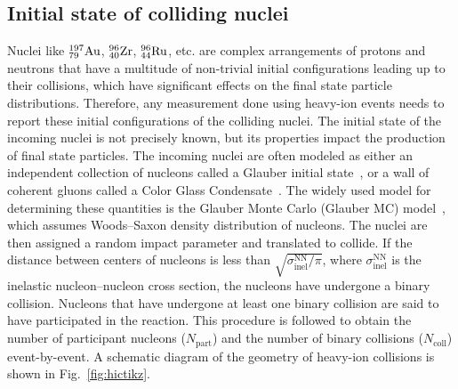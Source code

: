 \subsection{Initial state of colliding nuclei}
Nuclei like $\rm ^{197}_{79}Au$, $\rm ^{96}_{40}Zr$, $\rm ^{96}_{44}Ru$,  etc. are complex arrangements of protons and neutrons that have a multitude of non-trivial initial configurations leading up to their collisions, which have significant effects on the final state particle distributions.
%
Therefore, any measurement done using heavy-ion events needs to report these initial configurations of the colliding nuclei.
%
The initial state of the incoming nuclei is not precisely known, but its properties impact the production of final state particles.  
%
The incoming nuclei are often modeled as either an independent collection of nucleons called a Glauber initial state~\cite{Miller:2007ri}, or a wall of coherent gluons called a Color Glass Condensate~\cite{IANCU2001583}. 
%
The widely used model for determining these quantities is the Glauber Monte Carlo (Glauber MC) model~\cite{Loizides_2015}, which assumes Woods--Saxon density distribution of nucleons.
%
The nuclei are then assigned a random impact parameter and translated to collide. 
%
If the distance between centers of nucleons is less than \(\sqrt{\sigma_\mathrm{inel}^\mathrm{NN}/\pi}\), where \(\sigma_\mathrm{inel}^\mathrm{NN}\) is the inelastic nucleon–nucleon cross section, the nucleons have undergone a binary collision. 
%
Nucleons that have undergone at least one binary collision are said to have participated in the reaction.
%
This procedure is followed to obtain the number of participant nucleons (\(N_\mathrm{part}\)) and the number of binary collisions (\(N_\mathrm{coll}\)) event-by-event. 
%
A schematic diagram of the geometry of heavy-ion collisions is shown in Fig.~\ref{fig:hictikz}. 
